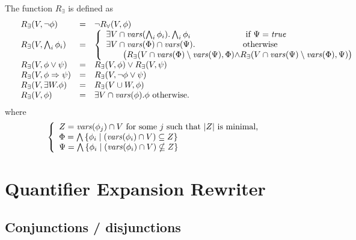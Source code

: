 \documentclass{article}
\newcommand{\vars}{\mathit{vars}}
\begin{document}
The function $R_{\exists}$ is defined as
\begin{equation*}
\begin{array}{lll}
R_{\exists}(V,\neg \phi)&=&\neg R_{\forall}(V,\phi)\\

R_{\exists}(V, \bigwedge_i \phi_i)&=&
   \left\{
     \begin{array}{ll}
       \exists V \cap \vars(\bigwedge_i \phi_i). \bigwedge_i \phi_i & \text{ if } \Psi = \mathit{true} \\

      \exists V \cap \vars(\Phi) \cap \vars(\Psi). & \text{otherwise}\\
      \qquad \big(
           R_\exists(V \cap \vars(\Phi) \setminus \vars(\Psi), \Phi) \mathrlap{\land R_\exists(V \cap \vars(\Psi) \setminus \vars(\Phi), \Psi) \big)}
    \end{array}
     \right.
  \\

R_{\exists}(V,\phi\vee \psi)&=&R_{\exists}(V,\phi)\vee R_{\exists}(V,\psi)\\

R_{\exists}(V,\phi\Rightarrow\psi)&=& R_{\exists}(V,\neg \phi \lor \psi) \\

R_{\exists}(V,\exists W.\phi)&=&R_{\exists}(V \cup W,\phi)\\

R_{\exists}(V,\phi)&=&\exists V\cap\vars(\phi).\phi\textrm{ otherwise}.
\end{array}
\end{equation*}
where
\[
     \left\{
       \begin{array}{l}
          Z = \vars(\phi_j) \cap V \text{ for some $j$ such that $|Z|$ is minimal,} \\
          \Phi = \bigwedge {\{ \phi_i \mid (\vars(\phi_i) \cap V) \subseteq Z \}} \\
          \Psi = \bigwedge {\{ \phi_i \mid (\vars(\phi_i) \cap V) \nsubseteq Z \}}
       \end{array}
     \right. \\
\]

\newpage
\section{Quantifier Expansion Rewriter}

\subsection{Conjunctions / disjunctions}
\end{document}
